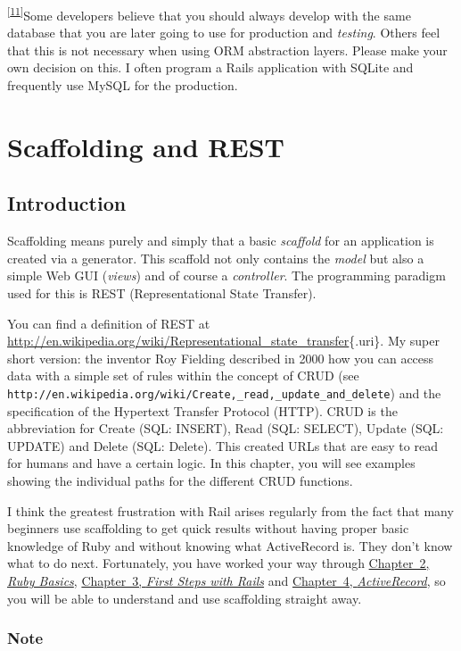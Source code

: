 \documentclass[a4paper]{book}
\newcounter{tab}[chapter]
\newcommand{\chap}[1]{\newpage\thispagestyle{empty}\chapter{#1}\label{chap:\thechapter}}
\begin{document}
\textsuperscript{{[}\hyperref[idp5093968]{11}{]}}Some developers believe that you should always develop with the same database that you are later going to use for production and \emph{testing}. Others feel that this is not necessary when using ORM abstraction layers. Please make your own decision on this. I often program a Rails application with SQLite and frequently use MySQL for the production.

\chap{Scaffolding and REST}\label{scaffolding-and-rest}

\section{Introduction}\label{introduction-1}

Scaffolding means purely and simply that a basic \emph{scaffold} for an application is created via a generator. This scaffold not only contains the \emph{model} but also a simple Web GUI (\emph{views}) and of course a \emph{controller}. The programming paradigm used for this is REST (Representational State Transfer).

You can find a definition of REST at \url{http://en.wikipedia.org/wiki/Representational_state_transfer}\{.uri\}. My super short version: the inventor Roy Fielding described in 2000 how you can access data with a simple set of rules within the concept of CRUD (see \texttt{http://en.wikipedia.org/wiki/Create,\_read,\_update\_and\_delete}) and the specification of the Hypertext Transfer Protocol (HTTP). CRUD is the abbreviation for Create (SQL: INSERT), Read (SQL: SELECT), Update (SQL: UPDATE) and Delete (SQL: Delete). This created URLs that are easy to read for humans and have a certain logic. In this chapter, you will see examples showing the individual paths for the different CRUD functions.

I think the greatest frustration with Rail arises regularly from the fact that many beginners use scaffolding to get quick results without having proper basic knowledge of Ruby and without knowing what ActiveRecord is. They don't know what to do next. Fortunately, you have worked your way through \hyperref[ruby-grundlagen]{Chapter~2, \emph{Ruby Basics}}, \hyperref[ersteux5fschritteux5fmitux5frails]{Chapter~3, \emph{First Steps with Rails}} and \hyperref[activerecordux5fchapter]{Chapter~4, \emph{ActiveRecord}}, so you will be able to understand and use scaffolding straight away.

\subsection{Note}\label{note-32}
\end{document}
